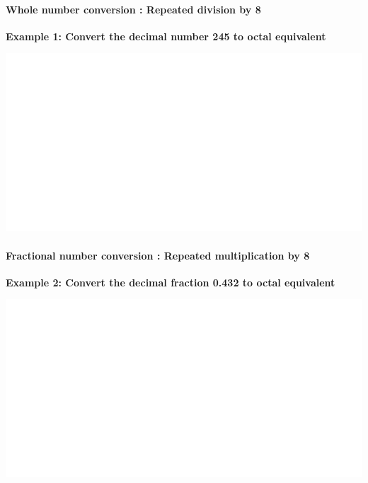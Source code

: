 \documentclass[]{book}
\let\oldparagraph\paragraph
\renewcommand{\paragraph}[1]{\oldparagraph{#1}\mbox{}}
\begin{document}
\hypertarget{whole-number-conversion-repeated-division-by-8}{%
\paragraph{Whole number conversion : Repeated division by 8}\label{whole-number-conversion-repeated-division-by-8}}

\textbf{Example 1: Convert the decimal number 245 to octal equivalent}

\begin{center}\includegraphics[width=1\linewidth]{figure/NSbox10-1} \end{center}

\hypertarget{fractional-number-conversion-repeated-multiplication-by-8}{%
\paragraph{Fractional number conversion : Repeated multiplication by 8}\label{fractional-number-conversion-repeated-multiplication-by-8}}

\textbf{Example 2: Convert the decimal fraction 0.432 to octal equivalent}

\begin{center}\includegraphics[width=1\linewidth]{figure/NSbox11-1} \end{center}
\end{document}
